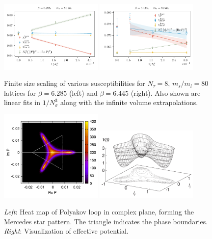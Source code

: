 \begin{figure}
  \centering
  \includegraphics[width=0.45\textwidth]{figs/allSuscs_b6285.pdf}
  \includegraphics[width=0.45\textwidth]{figs/allSuscs_b6445.pdf}
  \caption{Finite size scaling of various susceptibilities
           for $N_\tau=8$, $m_s/m_l=80$ lattices for
           $\beta=6.285$ (left) and $\beta=6.445$ (right). Also shown are
           linear fits in $1/N_\sigma^3$ along with the
           infinite volume extrapolations.}
  \label{fig:FSSScalingOfSuscs}
\end{figure}


\begin{figure}
  \centering
  \includegraphics[width=0.45\textwidth]{figs/mercedesStar.pdf}
  \includegraphics[width=0.45\textwidth]{figs/ploopPotential.pdf}
  \caption{{\it Left}: Heat map of Polyakov loop in complex plane, forming the
  Mercedes star pattern. The triangle indicates the phase boundaries.
  {\it Right}: Visualization of effective potential.}
  \label{fig:mercedesStar}
\end{figure}



